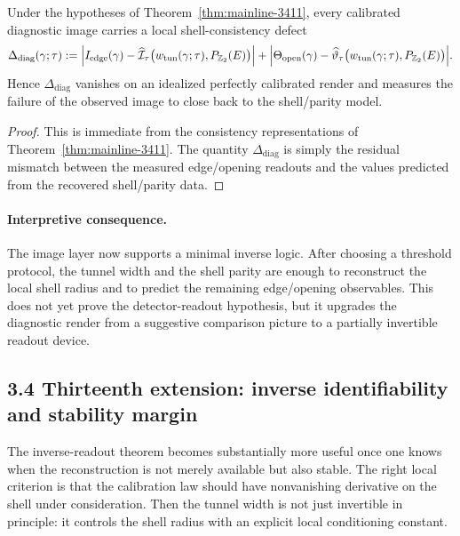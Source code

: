 \begin{corollary}
\label{cor:mainline-3411-defect}
Under the hypotheses of Theorem~\ref{thm:mainline-3411}, every calibrated diagnostic image carries a local shell-consistency defect
\[
  \Delta_{\mathrm{diag}}(\gamma;\tau)
  :=\Bigl|I_{\mathrm{edge}}(\gamma)-\widehat{\mathcal I}_\tau\bigl(w_{\mathrm{tun}}(\gamma;\tau),P_{\mathbb Z_2}(E)\bigr)\Bigr|
   +\Bigl|\Theta_{\mathrm{open}}(\gamma)-\widehat{\vartheta}_\tau\bigl(w_{\mathrm{tun}}(\gamma;\tau),P_{\mathbb Z_2}(E)\bigr)\Bigr|.
\]
Hence $\Delta_{\mathrm{diag}}$ vanishes on an idealized perfectly calibrated render and measures the failure of the observed image to close back to the shell/parity model.
\end{corollary}

\begin{proof}
This is immediate from the consistency representations of Theorem~\ref{thm:mainline-3411}. The quantity $\Delta_{\mathrm{diag}}$ is simply the residual mismatch between the measured edge/opening readouts and the values predicted from the recovered shell/parity data.
\end{proof}

\paragraph{Interpretive consequence.}
The image layer now supports a minimal inverse logic. After choosing a threshold protocol, the tunnel width and the shell parity are enough to reconstruct the local shell radius and to predict the remaining edge/opening observables. This does not yet prove the detector-readout hypothesis, but it upgrades the diagnostic render from a suggestive comparison picture to a partially invertible readout device.



\subsection*{3.4 Thirteenth extension: inverse identifiability and stability margin}
The inverse-readout theorem becomes substantially more useful once one knows when the reconstruction is not merely available but also stable. The right local criterion is that the calibration law should have nonvanishing derivative on the shell under consideration. Then the tunnel width is not just invertible in principle: it controls the shell radius with an explicit local conditioning constant.

